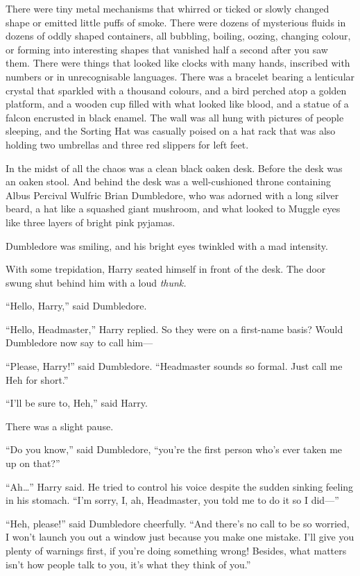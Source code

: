There were tiny metal mechanisms that whirred or ticked or slowly changed shape or emitted little puffs of smoke. There were dozens of mysterious fluids in dozens of oddly shaped containers, all bubbling, boiling, oozing, changing colour, or forming into interesting shapes that vanished half a second after you saw them. There were things that looked like clocks with many hands, inscribed with numbers or in unrecognisable languages. There was a bracelet bearing a lenticular crystal that sparkled with a thousand colours, and a bird perched atop a golden platform, and a wooden cup filled with what looked like blood, and a statue of a falcon encrusted in black enamel. The wall was all hung with pictures of people sleeping, and the Sorting Hat was casually poised on a hat rack that was also holding two umbrellas and three red slippers for left feet.

In the midst of all the chaos was a clean black oaken desk. Before the desk was an oaken stool. And behind the desk was a well-cushioned throne containing Albus Percival Wulfric Brian Dumbledore, who was adorned with a long silver beard, a hat like a squashed giant mushroom, and what looked to Muggle eyes like three layers of bright pink pyjamas.

Dumbledore was smiling, and his bright eyes twinkled with a mad intensity.

With some trepidation, Harry seated himself in front of the desk. The door swung shut behind him with a loud \emph{thunk.}

“Hello, Harry,” said Dumbledore.

“Hello, Headmaster,” Harry replied. So they were on a first-name basis? Would Dumbledore now say to call him—

“Please, Harry!” said Dumbledore. “Headmaster sounds so formal. Just call me Heh for short.”

“I’ll be sure to, Heh,” said Harry.

There was a slight pause.

“Do you know,” said Dumbledore, “you’re the first person who’s ever taken me up on that?”

“Ah…” Harry said. He tried to control his voice despite the sudden sinking feeling in his stomach. “I’m sorry, I, ah, Headmaster, you told me to do it so I did—”

“Heh, please!” said Dumbledore cheerfully. “And there’s no call to be so worried, I won’t launch you out a window just because you make one mistake. I’ll give you plenty of warnings first, if you’re doing something wrong! Besides, what matters isn’t how people talk to you, it’s what they think of you.”


